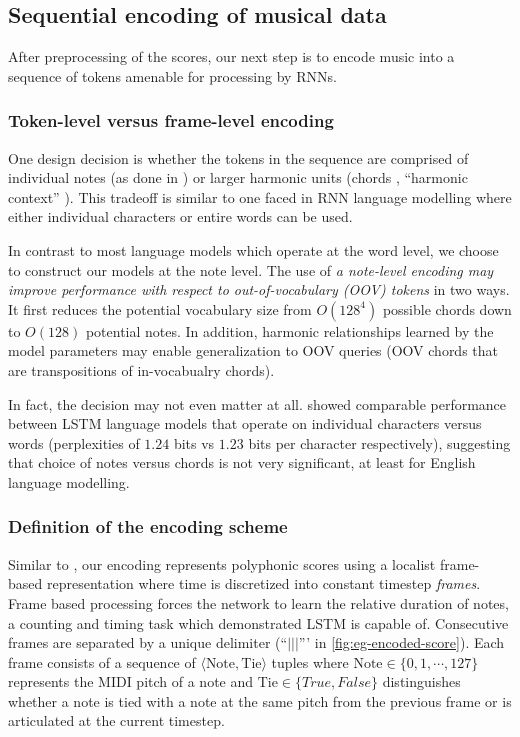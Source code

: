 \subsection{Sequential encoding of musical data}
\label{sec:sequential-encoding}


After preprocessing of the scores, our next step is to encode music into a
sequence of tokens amenable for processing by RNNs.

\subsubsection{Token-level versus frame-level encoding}

One design decision is whether the tokens in the sequence are comprised of
individual notes (as done in
\citep{mozer1994neural,franklin2004recurrent,sturm2016music}) or larger
harmonic units (\eg chords \citep{Eck2002,Boulanger-Lewandowski2012},
``harmonic context'' \citep{Allan2005}). This tradeoff is similar to one faced
in RNN language modelling where either individual characters or entire words
can be used.

In contrast to most language models which operate at the word level, we choose
to construct our models at the note level. The use of \emph{a note-level encoding may
improve performance with respect to out-of-vocabulary (OOV) tokens} in two ways.
It first reduces the potential vocabulary size from $O(128^4)$ possible chords
down to $O(128)$ potential notes. In addition, harmonic relationships learned
by the model parameters may enable generalization to OOV queries (\eg OOV
chords that are transpositions of in-vocabualry chords).

In fact, the decision may not even matter at all. \citet{graves2013generating}
showed comparable performance between LSTM language models that operate on
individual characters versus words (perplexities of $1.24$ bits vs $1.23$ bits
per character respectively), suggesting that choice of notes versus chords is not
very significant, at least for English language modelling.

\subsubsection{Definition of the encoding scheme}

Similar to \citep{todd1989connectionist}, our encoding represents polyphonic
scores using a localist frame-based representation where time is discretized
into constant timestep \emph{frames}. Frame based processing forces the network
to learn the relative duration of notes, a counting and timing task which
\citep{gers2002learning} demonstrated LSTM is capable of. Consecutive frames
are separated by a unique delimiter (``$|||$''' in
\vref{fig:eg-encoded-score}). Each frame consists of a sequence of $\langle
\text{Note}, \text{Tie} \rangle$ tuples where $\text{Note} \in
\{0,1,\cdots,127\}$ represents the MIDI pitch of a note and $\text{Tie} \in
\{True,False\}$ distinguishes whether a note is tied with a note at the same
pitch from the previous frame or is articulated at the current timestep.

